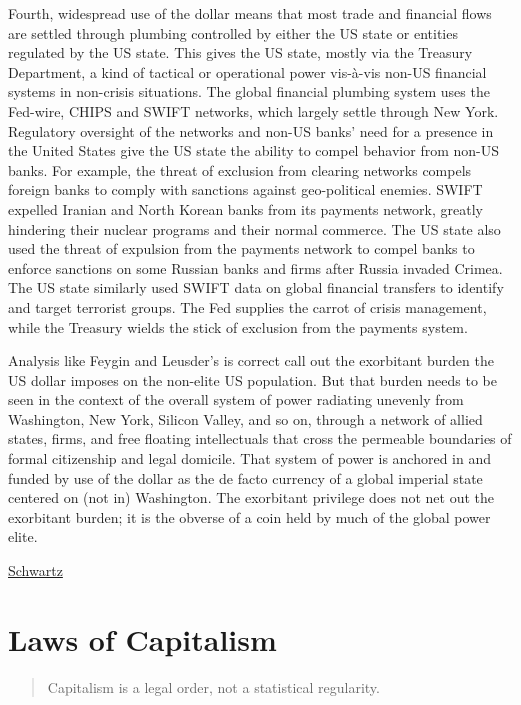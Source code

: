 \documentclass[
]{book}
\begin{document}
Fourth, widespread use of the dollar means that most trade and financial flows are settled through plumbing controlled by either the US state or entities regulated by the US state. This gives the US state, mostly via the Treasury Department, a kind of tactical or operational power vis-à-vis non-US financial systems in non-crisis situations. The global financial plumbing system uses the Fed-wire, CHIPS and SWIFT networks, which largely settle through New York. Regulatory oversight of the networks and non-US banks' need for a presence in the United States give the US state the ability to compel behavior from non-US banks. For example, the threat of exclusion from clearing networks compels foreign banks to comply with sanctions against geo-political enemies. SWIFT expelled Iranian and North Korean banks from its payments network, greatly hindering their nuclear programs and their normal commerce. The US state also used the threat of expulsion from the payments network to compel banks to enforce sanctions on some Russian banks and firms after Russia invaded Crimea. The US state similarly used SWIFT data on global financial transfers to identify and target terrorist groups. The Fed supplies the carrot of crisis management, while the Treasury wields the stick of exclusion from the payments system.

Analysis like Feygin and Leusder's is correct call out the exorbitant burden the US dollar imposes on the non-elite US population. But that burden needs to be seen in the context of the overall system of power radiating unevenly from Washington, New York, Silicon Valley, and so on, through a network of allied states, firms, and free floating intellectuals that cross the permeable boundaries of formal citizenship and legal domicile. That system of power is anchored in and funded by use of the dollar as the de facto currency of a global imperial state centered on (not in) Washington. The exorbitant privilege does not net out the exorbitant burden; it is the obverse of a coin held by much of the global power elite.

\href{https://phenomenalworld.org/analysis/dollar-and-empire}{Schwartz}

\hypertarget{laws-of-capitalism}{%
\chapter{Laws of Capitalism}\label{laws-of-capitalism}}

\begin{quote}
Capitalism is a legal order, not a statistical regularity.
\end{quote}
\end{document}
